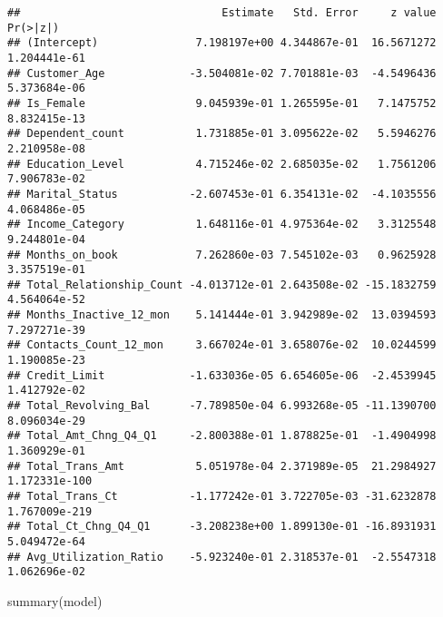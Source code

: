 \documentclass[
]{article}
\newenvironment{Shaded}{\begin{snugshade}}{\end{snugshade}}
\newcommand{\FunctionTok}[1]{\textcolor[rgb]{0.00,0.00,0.00}{#1}}
\newcommand{\NormalTok}[1]{#1}
\begin{document}
\begin{verbatim}
##                               Estimate   Std. Error     z value      Pr(>|z|)
## (Intercept)               7.198197e+00 4.344867e-01  16.5671272  1.204441e-61
## Customer_Age             -3.504081e-02 7.701881e-03  -4.5496436  5.373684e-06
## Is_Female                 9.045939e-01 1.265595e-01   7.1475752  8.832415e-13
## Dependent_count           1.731885e-01 3.095622e-02   5.5946276  2.210958e-08
## Education_Level           4.715246e-02 2.685035e-02   1.7561206  7.906783e-02
## Marital_Status           -2.607453e-01 6.354131e-02  -4.1035556  4.068486e-05
## Income_Category           1.648116e-01 4.975364e-02   3.3125548  9.244801e-04
## Months_on_book            7.262860e-03 7.545102e-03   0.9625928  3.357519e-01
## Total_Relationship_Count -4.013712e-01 2.643508e-02 -15.1832759  4.564064e-52
## Months_Inactive_12_mon    5.141444e-01 3.942989e-02  13.0394593  7.297271e-39
## Contacts_Count_12_mon     3.667024e-01 3.658076e-02  10.0244599  1.190085e-23
## Credit_Limit             -1.633036e-05 6.654605e-06  -2.4539945  1.412792e-02
## Total_Revolving_Bal      -7.789850e-04 6.993268e-05 -11.1390700  8.096034e-29
## Total_Amt_Chng_Q4_Q1     -2.800388e-01 1.878825e-01  -1.4904998  1.360929e-01
## Total_Trans_Amt           5.051978e-04 2.371989e-05  21.2984927 1.172331e-100
## Total_Trans_Ct           -1.177242e-01 3.722705e-03 -31.6232878 1.767009e-219
## Total_Ct_Chng_Q4_Q1      -3.208238e+00 1.899130e-01 -16.8931931  5.049472e-64
## Avg_Utilization_Ratio    -5.923240e-01 2.318537e-01  -2.5547318  1.062696e-02
\end{verbatim}

\begin{Shaded}
\begin{Highlighting}[]
\FunctionTok{summary}\NormalTok{(model)}
\end{Highlighting}
\end{Shaded}
\end{document}
